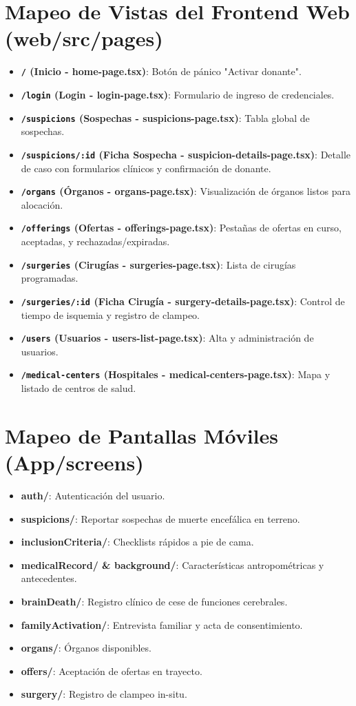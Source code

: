 \documentclass[11pt, a4paper]{article}
\begin{document}
\newpage

\section{Mapeo de Vistas del Frontend Web (web/src/pages)}
\begin{itemize}
    \item \textbf{\texttt{/} (Inicio - home-page.tsx)}: Botón de pánico "Activar donante".
    \item \textbf{\texttt{/login} (Login - login-page.tsx)}: Formulario de ingreso de credenciales.
    \item \textbf{\texttt{/suspicions} (Sospechas - suspicions-page.tsx)}: Tabla global de sospechas.
    \item \textbf{\texttt{/suspicions/:id} (Ficha Sospecha - suspicion-details-page.tsx)}: Detalle de caso con formularios clínicos y confirmación de donante.
    \item \textbf{\texttt{/organs} (Órganos - organs-page.tsx)}: Visualización de órganos listos para alocación.
    \item \textbf{\texttt{/offerings} (Ofertas - offerings-page.tsx)}: Pestañas de ofertas en curso, aceptadas, y rechazadas/expiradas.
    \item \textbf{\texttt{/surgeries} (Cirugías - surgeries-page.tsx)}: Lista de cirugías programadas.
    \item \textbf{\texttt{/surgeries/:id} (Ficha Cirugía - surgery-details-page.tsx)}: Control de tiempo de isquemia y registro de clampeo.
    \item \textbf{\texttt{/users} (Usuarios - users-list-page.tsx)}: Alta y administración de usuarios.
    \item \textbf{\texttt{/medical-centers} (Hospitales - medical-centers-page.tsx)}: Mapa y listado de centros de salud.
\end{itemize}

\section{Mapeo de Pantallas Móviles (App/screens)}
\begin{itemize}
    \item \textbf{auth/}: Autenticación del usuario.
    \item \textbf{suspicions/}: Reportar sospechas de muerte encefálica en terreno.
    \item \textbf{inclusionCriteria/}: Checklists rápidos a pie de cama.
    \item \textbf{medicalRecord/ \& background/}: Características antropométricas y antecedentes.
    \item \textbf{brainDeath/}: Registro clínico de cese de funciones cerebrales.
    \item \textbf{familyActivation/}: Entrevista familiar y acta de consentimiento.
    \item \textbf{organs/}: Órganos disponibles.
    \item \textbf{offers/}: Aceptación de ofertas en trayecto.
    \item \textbf{surgery/}: Registro de clampeo in-situ.
\end{itemize}
\end{document}
